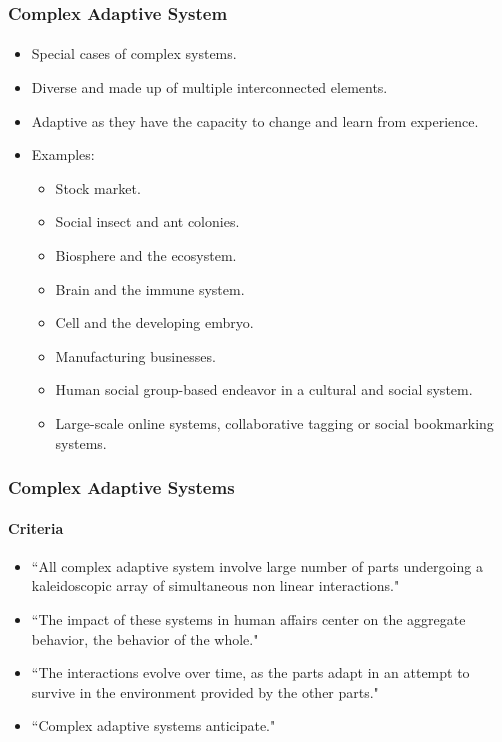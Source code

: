 \frame
{
	\frametitle{Complex Adaptive System}
	\framesubtitle{}

	\begin{itemize}
		\item Special cases of complex systems.
		\item Diverse and made up of multiple interconnected elements.
		\item Adaptive as they have the capacity to change and learn from experience.
		\item Examples:
		\begin{itemize}
			\item Stock market.
			\item Social insect and ant colonies.
			\item Biosphere and the ecosystem.
			\item Brain and the immune system.
			\item Cell and the developing embryo.
			\item Manufacturing businesses.
			\item Human social group-based endeavor in a cultural and social system.
			\item Large-scale online systems, collaborative tagging or social bookmarking systems.
		\end{itemize}
	\end{itemize}
}

\frame
{
	\frametitle{Complex Adaptive Systems}
	\framesubtitle{Criteria}

	\begin{itemize}
		\item ``All complex adaptive system involve large number of parts undergoing a kaleidoscopic
array of simultaneous non linear interactions."
		\item ``The impact of these systems in human affairs center on the aggregate behavior, the
behavior of the whole."
		\item ``The interactions evolve over time, as the parts adapt in an attempt to survive in the
environment provided by the other parts."
		\item ``Complex adaptive systems anticipate."
	\end{itemize}
}

